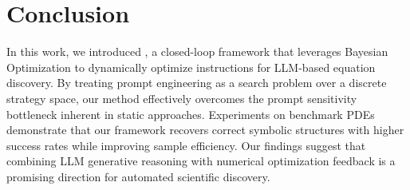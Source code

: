 \section{Conclusion}

In this work, we introduced \ours, a closed-loop framework that leverages Bayesian Optimization to dynamically optimize instructions for LLM-based equation discovery. By treating prompt engineering as a search problem over a discrete strategy space, our method effectively overcomes the prompt sensitivity bottleneck inherent in static approaches. Experiments on benchmark PDEs demonstrate that our framework recovers correct symbolic structures with higher success rates while improving sample efficiency. Our findings suggest that combining LLM generative reasoning with numerical optimization feedback is a promising direction for automated scientific discovery.
